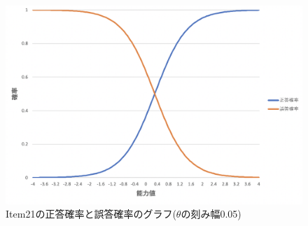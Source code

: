 \documentclass[12pt]{jarticle}
\begin{document}
\begin{figure}[h]
    \begin{center}
        \includegraphics[scale=0.4]{kadai5_2_4.png}
    \end{center}
    \caption{Item21の正答確率と誤答確率のグラフ($\theta$の刻み幅0.05)}
\end{figure}
\end{document}
